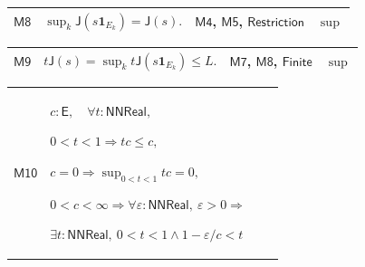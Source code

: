\documentclass[11pt]{amsart}
\newlength{\FTCFourColumnBody}
\begin{document}
{\begin{tabular}
\end{tabular}%
\par\setlength{\parskip}{0pt}\nointerlineskip
\noindent
\begin{tabular}{|@{}>{\centering\arraybackslash}m{0.078431\FTCFourColumnBody}|>{\centering\arraybackslash}m{0.535947\FTCFourColumnBody}|>{\centering\arraybackslash}m{0.281045\FTCFourColumnBody}|>{\centering\arraybackslash}m{0.104575\FTCFourColumnBody}|}\hline
\hypertarget{proof:M8}{$\displaystyle \textsf{M8}$} & $\displaystyle \sup_k\textsf{J}(s\mathbf1_{E_k})=\textsf{J}(s).$ & \hyperlink{proof:M4}{$\displaystyle \textsf{M4}$}, \hyperlink{proof:M5}{$\displaystyle \textsf{M5}$}, \hyperlink{lem:Restriction}{$\displaystyle \textsf{Restriction}$} & $\displaystyle \sup$\\ \hline
\end{tabular}%
\par\setlength{\parskip}{0pt}\nointerlineskip
\noindent
\begin{tabular}{|@{}>{\centering\arraybackslash}m{0.078431\FTCFourColumnBody}|>{\centering\arraybackslash}m{0.535947\FTCFourColumnBody}|>{\centering\arraybackslash}m{0.281045\FTCFourColumnBody}|>{\centering\arraybackslash}m{0.104575\FTCFourColumnBody}|}\hline
\hypertarget{proof:M9}{$\displaystyle \textsf{M9}$} & $\displaystyle t\textsf{J}(s)=\sup_k t\textsf{J}(s\mathbf1_{E_k})\le L.$ & \hyperlink{proof:M7}{$\displaystyle \textsf{M7}$}, \hyperlink{proof:M8}{$\displaystyle \textsf{M8}$}, \hyperlink{lem:Finite}{$\displaystyle \textsf{Finite}$} & $\displaystyle \sup$\\ \hline
\end{tabular}%
\par\setlength{\parskip}{0pt}\nointerlineskip
\noindent
\begin{tabular}{|@{}>{\centering\arraybackslash}m{0.078431\FTCFourColumnBody}|>{\centering\arraybackslash}m{0.535947\FTCFourColumnBody}|>{\centering\arraybackslash}m{0.281045\FTCFourColumnBody}|>{\centering\arraybackslash}m{0.104575\FTCFourColumnBody}|}\hline
\hypertarget{proof:M10}{$\displaystyle \textsf{M10}$} & $\displaystyle c:\textsf{E},\quad\forall t:\textsf{NNReal},$\par
$\displaystyle 0<t<1\Rightarrow tc\le c,$\par
$\displaystyle c=0\Rightarrow\sup_{0<t<1}tc=0,$\par
$\displaystyle 0<c<\infty\Rightarrow\forall\varepsilon:\textsf{NNReal},\ \varepsilon>0\Rightarrow$\par
$\displaystyle \exists t:\textsf{NNReal},\ 0<t<1\land1-\varepsilon/c<t$\par

\end{tabular}}
\end{document}
